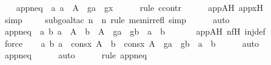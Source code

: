 \begin{isabellebody}
\isanewline
\ \ \isamarkupfalse%
\ appneq\ {\isacharcolon}{\kern0pt}\ {\isachardoublequoteopen}{\isasymAnd}a{\isachardot}{\kern0pt}\ a\ {\isasymin}\ A\ {\isasymLongrightarrow}\ g{\isacharbackquote}{\kern0pt}a\ {\isasymnoteq}\ g{\isacharbackquote}{\kern0pt}x{\isachardoublequoteclose}\ \isanewline
\ \ \ \ \isamarkupfalse%
{\isacharparenleft}{\kern0pt}rule\ ccontr{\isacharparenright}{\kern0pt}\isanewline
\ \ \ \ \isamarkupfalse%
\ appAH{\isacharprime}{\kern0pt}\ appxH\isanewline
\ \ \ \ \isamarkupfalse%
\ simp\isanewline
\ \ \ \ \isamarkupfalse%
{\isacharparenleft}{\kern0pt}subgoal{\isacharunderscore}{\kern0pt}tac\ {\isachardoublequoteopen}n\ {\isasymin}\ n{\isachardoublequoteclose}{\isacharcomma}{\kern0pt}\ rule\ mem{\isacharunderscore}{\kern0pt}irrefl{\isacharcomma}{\kern0pt}\ simp{\isacharparenright}{\kern0pt}\isanewline
\ \ \ \ \isamarkupfalse%
\ auto\isanewline
\isanewline
\ \ \isamarkupfalse%
\ appneq{\isacharprime}{\kern0pt}\ {\isacharcolon}{\kern0pt}\ {\isachardoublequoteopen}{\isasymAnd}a\ b{\isachardot}{\kern0pt}\ a\ {\isasymin}\ A\ {\isasymLongrightarrow}\ b\ {\isasymin}\ A\ {\isasymLongrightarrow}\ g{\isacharbackquote}{\kern0pt}a\ {\isacharequal}{\kern0pt}\ g{\isacharbackquote}{\kern0pt}b\ {\isasymLongrightarrow}\ a\ {\isacharequal}{\kern0pt}\ b{\isachardoublequoteclose}\ \isanewline
\ \ \ \ \isamarkupfalse%
\ appAH\ nfH\ inj{\isacharunderscore}{\kern0pt}def\ \isanewline
\ \ \ \ \isamarkupfalse%
\ force\isanewline
\isanewline
\ \ \isamarkupfalse%
\ {\isachardoublequoteopen}{\isasymAnd}a\ b{\isachardot}{\kern0pt}\ a\ {\isasymin}\ cons{\isacharparenleft}{\kern0pt}x{\isacharcomma}{\kern0pt}\ A{\isacharparenright}{\kern0pt}\ {\isasymLongrightarrow}\ b\ {\isasymin}\ cons{\isacharparenleft}{\kern0pt}x{\isacharcomma}{\kern0pt}\ A{\isacharparenright}{\kern0pt}\ {\isasymLongrightarrow}\ g{\isacharbackquote}{\kern0pt}a\ {\isacharequal}{\kern0pt}\ g{\isacharbackquote}{\kern0pt}b\ {\isasymLongrightarrow}\ a\ {\isacharequal}{\kern0pt}\ b{\isachardoublequoteclose}\isanewline
\ \ \ \ \isamarkupfalse%
\ auto\isanewline
\ \ \ \ \isamarkupfalse%
\ appneq\isanewline
\ \ \ \ \isamarkupfalse%
\ auto{\isacharbrackleft}{\kern0pt}{}{\isacharbrackright}{\kern0pt}\ \isanewline
\ \ \ \ \isamarkupfalse%
{\isacharparenleft}{\kern0pt}rule\ appneq{\isacharprime}{\kern0pt}{\isacharparenright}{\kern0pt}\isanewline
\ \ \ \ \isamarkupfalse%

\end{isabellebody}
